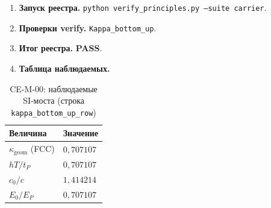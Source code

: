 \label{exp:cem00}
\begin{enumerate}[label=\textbf{Шаг \arabic*:},leftmargin=*,itemsep=0.35em]
\item \textbf{Запуск реестра.} \texttt{python verify\_principles.py --suite carrier}.
\item \textbf{Проверки verify.} \texttt{Kappa\_bottom\_up}.
\item \textbf{Итог реестра.} \textbf{PASS}.
\item \textbf{Таблица наблюдаемых.}
\end{enumerate}
\medskip
\begin{table}[htbp]
\centering
\small
\caption{CE-M-00: наблюдаемые SI-моста (строка \texttt{kappa\_bottom\_up\_row})}
\label{tab:exp-ce-m-00}
\begin{tabular}{@{}ll@{}}
\toprule
Величина & Значение \\
\midrule
$\kappa_{\mathrm{geom}}$ (FCC) & $0{,}707107$ \\
$hT/t_P$ & $0{,}707107$ \\
$c_0/c$ & $1{,}414214$ \\
$E_0/E_P$ & $0{,}707107$ \\
\bottomrule
\end{tabular}
\end{table}
